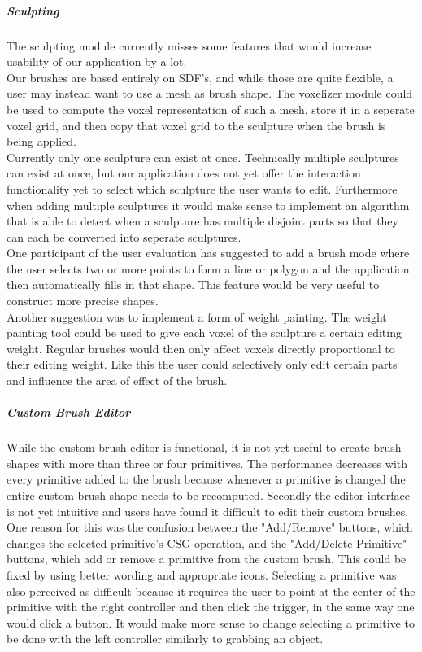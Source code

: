 \subparagraph{Sculpting}
The sculpting module currently misses some features that would increase usability of our application by a lot.\\
Our brushes are based entirely on SDF's, and while those are quite flexible, a user may instead want to use a mesh as brush shape. The voxelizer module could be used to compute the voxel representation of such a mesh, store it in a seperate voxel grid, and then copy that voxel grid to the sculpture when the brush is being applied.\\
Currently only one sculpture can exist at once. Technically multiple sculptures can exist at once, but our application does not yet offer the interaction functionality yet to select which sculpture the user wants to edit. Furthermore when adding multiple sculptures it would make sense to implement an algorithm that is able to detect when a sculpture has multiple disjoint parts so that they can each be converted into seperate sculptures.\\
One participant of the user evaluation has suggested to add a brush mode where the user selects two or more points to form a line or polygon and the application then automatically fills in that shape. This feature would be very useful to construct more precise shapes.\\
Another suggestion was to implement a form of weight painting. The weight painting tool could be used to give each voxel of the sculpture a certain editing weight. Regular brushes would then only affect voxels directly proportional to their editing weight. Like this the user could selectively only edit certain parts and influence the area of effect of the brush.

\subparagraph{Custom Brush Editor}
While the custom brush editor is functional, it is not yet useful to create brush shapes with more than three or four primitives. The performance decreases with every primitive added to the brush because whenever a primitive is changed the entire custom brush shape needs to be recomputed. Secondly the editor interface is not yet intuitive and users have found it difficult to edit their custom brushes. One reason for this was the confusion between the "Add/Remove" buttons, which changes the selected primitive's CSG operation, and the "Add/Delete Primitive" buttons, which add or remove a primitive from the custom brush. This could be fixed by using better wording and appropriate icons. Selecting a primitive was also perceived as difficult because it requires the user to point at the center of the primitive with the right controller and then click the trigger, in the same way one would click a button. It would make more sense to change selecting a primitive to be done with the left controller similarly to grabbing an object.

